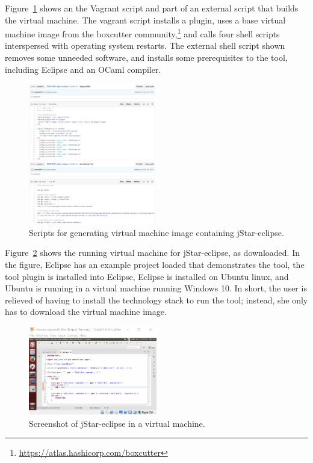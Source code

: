 \documentclass[10pt,conference]{IEEEtran}
\begin{document}
Figure~\ref{fig:vagrant} shows an the Vagrant script and 
part of an external script that builds the virtual machine.
The vagrant script installs a plugin, 
uses a base virtual machine image from the boxcutter 
community,\footnote{\url{https://atlas.hashicorp.com/boxcutter}}
and calls four shell scripts interspersed with operating system 
restarts.
The external shell script shown removes some unneeded software,
and installs some prerequisites to the tool, including Eclipse and
an OCaml compiler. 

\begin{figure}[t]
  \centering
    \includegraphics[width=0.5\textwidth]{vagrant.png}
  \caption{Scripts for generating virtual machine image containing jStar-eclipse.}\label{fig:vagrant}
\end{figure}

Figure~\ref{fig:vm} shows the running virtual machine
for jStar-eclipse, as downloaded.
In the figure, 
Eclipse has an example project loaded that demonstrates
the tool, 
the tool plugin is installed into Eclipse,
Eclipse is installed on Ubuntu linux,
and Ubuntu is running in a virtual machine
running Windows 10. 
In short, the user is relieved of having to install
the technology stack to run the tool; instead, 
she only has to download the virtual machine image.

\begin{figure}[t]
  \centering
    \includegraphics[width=0.5\textwidth]{vm.png}
  \caption{Screenshot of jStar-eclipse in a virtual machine.}\label{fig:vm}
\end{figure}
\end{document}
